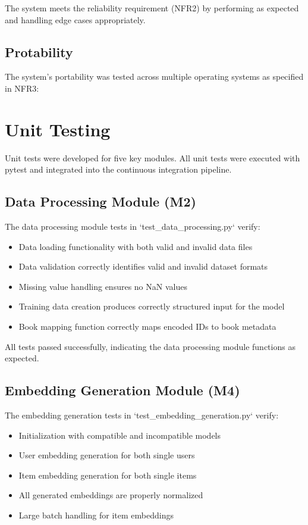 \documentclass[12pt, titlepage]{article}
\begin{document}
The system meets the reliability requirement (NFR2) by performing as expected and handling edge cases appropriately.

\subsection{Protability}

The system's portability was tested across multiple operating systems as specified in NFR3:

\section{Unit Testing}
Unit tests were developed for five key modules. All unit tests were executed with pytest and integrated into the continuous integration pipeline.

\subsection{Data Processing Module (M2)}
The data processing module tests in `test\_data\_processing.py` verify:
\begin{itemize}
    \item Data loading functionality with both valid and invalid data files
    \item Data validation correctly identifies valid and invalid dataset formats
    \item Missing value handling ensures no NaN values
    \item Training data creation produces correctly structured input for the model
    \item Book mapping function correctly maps encoded IDs to book metadata
\end{itemize}

All tests passed successfully, indicating the data processing module functions as expected.

\subsection{Embedding Generation Module (M4)}
The embedding generation tests in `test\_embedding\_generation.py` verify:
\begin{itemize}
    \item Initialization with compatible and incompatible models
    \item User embedding generation for both single users
    \item Item embedding generation for both single items
    \item All generated embeddings are properly normalized
    \item Large batch handling for item embeddings
\end{itemize}
\end{document}
